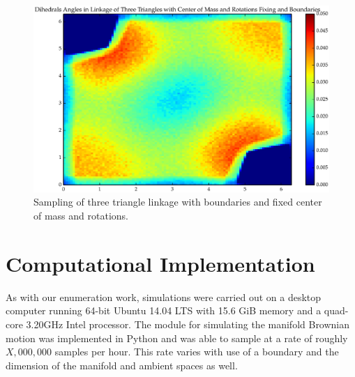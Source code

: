 \begin{figure}[ht]
\label{fig:T3_7}
\centering
  \includegraphics[scale=0.6]{images/T3_7_2D.eps}
\caption{Sampling of three triangle linkage with boundaries and fixed center of mass and rotations.}
\end{figure}

\section{Computational Implementation}

As with our enumeration work, simulations were carried out on a desktop computer running 64-bit Ubuntu 14.04 LTS with 15.6 GiB memory and a quad-core 3.20GHz Intel processor. The module for simulating the manifold Brownian motion was implemented in Python and was able to sample at a rate of roughly $X,000,000$ samples per hour. This rate varies with use of a boundary and the dimension of the manifold and ambient spaces as well. 
